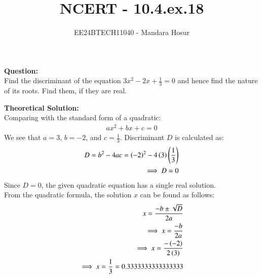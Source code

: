 \documentclass[journal]{IEEEtran}
\begin{document}

\vspace{3cm}

\title{NCERT - 10.4.ex.18}
\author{EE24BTECH11040 - Mandara Hosur}
{\let\newpage\relax\maketitle}

\renewcommand{\thefigure}{\theenumi}
\renewcommand{\thetable}{\theenumi}
\setlength{\intextsep}{10pt} %


\renewcommand{\thetable}{\theenumi}

\textbf{Question:}\\
Find the discriminant of the equation $3x^2 - 2x + \frac{1}{3} = 0$ and hence find the nature of its roots. Find them, if they are real.

\textbf{Theoretical Solution:}\\
Comparing with the standard form of a quadratic:
\begin{align}
    ax^2 + bx + c = 0 
\end{align}
We see that $a = 3$, $b = -2$, and $c = \frac{1}{3}$.
Discriminant $D$ is  calculated as:
\begin{align}
    D = b^2 - 4ac = \left(-2\right)^2 - 4\left(3\right)\left(\frac{1}{3}\right) \\
    \implies D = 0
\end{align}
Since $D = 0$, the given quadratic equation has a single real solution. \\
From the quadratic formula, the solution $x$ can be found as follows:
\begin{align}
    x = \frac{-b \pm \sqrt{D}}{2a} \\
    \implies x = \frac{-b}{2a} \\
    \implies x = \frac{-\left(-2\right)}{2\left(3\right)} \\
    \implies x = \frac{1}{3} = 0.3333333333333333
\end{align}
\end{document}
